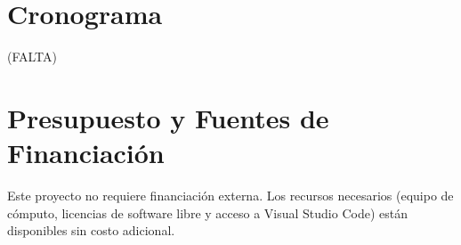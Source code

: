 \documentclass[12pt, letterpaper]{article}
\begin{document}
\section{Cronograma}
(FALTA)


\section{Presupuesto y Fuentes de Financiación}
Este proyecto no requiere financiación externa. Los recursos necesarios (equipo de cómputo, licencias de software libre y acceso a Visual Studio Code) están disponibles sin costo adicional.

\newpage

\end{document}
